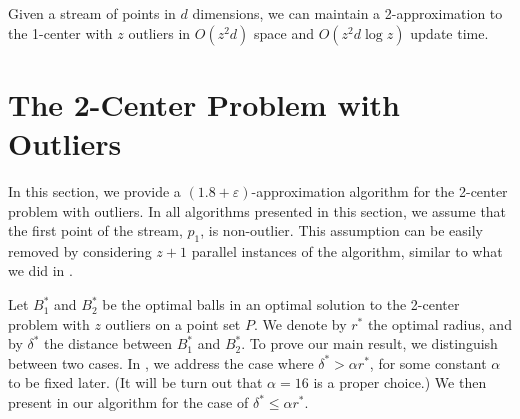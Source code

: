 \documentclass[envcountsame]{cls/cccg15}
\renewcommand{\O}{\ensuremath{{O}}}
\newcommand{\textproc}{\textsc}
\newcommand{\lee}{\leqslant}
\renewcommand{\leq}{\lee}
\newcommand{\eps}{\varepsilon}
\begin{document}
\begin{theorem} \label{thm:1-center-stream}
	Given a stream of points in $d$ dimensions,
	we can maintain a 2-approximation to the 1-center with $z$ outliers
	in $\O(z^2d)$ space and $\O (z^2d\log z)$ update time.
\end{theorem}

%






\section{The 2-Center Problem with Outliers}
\label{sec:2-center}

In this section, we provide a $(1.8 + \eps)$-approximation algorithm
for the 2-center problem with outliers.
In all algorithms presented in this section,
we assume that the first point of the stream, $p_1$, is non-outlier. 
This assumption can be easily removed by considering $z + 1$ parallel instances of the algorithm, 
similar to what we did in .

Let $B_1^*$ and $B_2^*$ be the optimal balls
in an optimal solution to the 2-center problem with $z$ outliers on a point set $P$.
We denote by $r^*$ the optimal radius,
and by $\delta^*$ the distance between $B_1^*$ and $B_2^*$.
To prove our main result, we distinguish between two cases.
In , we address the case where $\delta^* > \alpha r^*$, 
for some constant $\alpha$ to be fixed later.
(It will be turn out that $\alpha = 16$ is a proper choice.)
We then present in  
our algorithm for the case of $\delta^* \leq \alpha r^*$.
\end{document}
